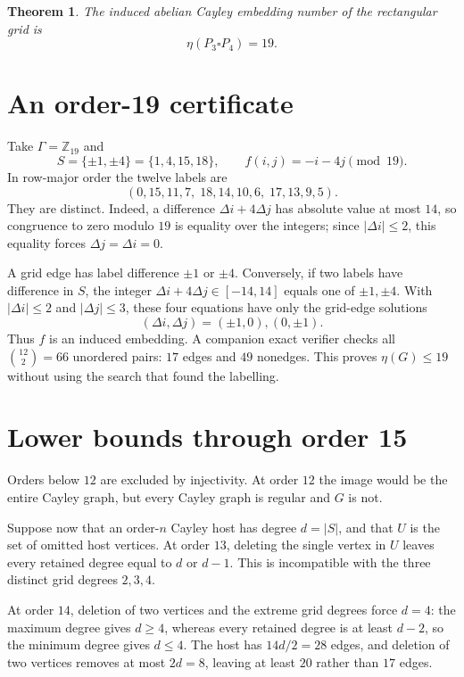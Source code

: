 \documentclass[11pt]{article}
\newtheorem{theorem}{Theorem}
\begin{document}
\begin{theorem}\label{thm:main}
The induced abelian Cayley embedding number of the rectangular grid is
\[
  \eta(P_3\square P_4)=19.
\]
\end{theorem}

\section{An order-19 certificate}

Take $\Gamma=\mathbb Z_{19}$ and
\[
 S=\{\pm1,\pm4\}=\{1,4,15,18\},\qquad
 f(i,j)=-i-4j\pmod {19}.
\]
In row-major order the twelve labels are
\[
 (0,15,11,7,\;18,14,10,6,\;17,13,9,5).
\]
They are distinct.  Indeed, a difference $\Delta i+4\Delta j$ has
absolute value at most $14$, so congruence to zero modulo $19$ is
equality over the integers; since $|\Delta i|\leq2$, this equality forces
$\Delta j=\Delta i=0$.

A grid edge has label difference $\pm1$ or $\pm4$.  Conversely, if two
labels have difference in $S$, the integer
$\Delta i+4\Delta j\in[-14,14]$ equals one of $\pm1,\pm4$.  With
$|\Delta i|\leq2$ and $|\Delta j|\leq3$, these four equations have only
the grid-edge solutions
\[
 (\Delta i,\Delta j)=(\pm1,0),(0,\pm1).
\]
Thus $f$ is an induced embedding.  A companion exact verifier checks all
$\binom{12}{2}=66$ unordered pairs: $17$ edges and $49$ nonedges.  This
proves $\eta(G)\leq19$ without using the search that found the labelling.

\section{Lower bounds through order 15}

Orders below $12$ are excluded by injectivity.  At order $12$ the image
would be the entire Cayley graph, but every Cayley graph is regular and
$G$ is not.

Suppose now that an order-$n$ Cayley host has degree $d=|S|$, and that
$U$ is the set of omitted host vertices.  At order $13$, deleting the
single vertex in $U$ leaves every retained degree equal to $d$ or $d-1$.
This is incompatible with the three distinct grid degrees $2,3,4$.

At order $14$, deletion of two vertices and the extreme grid degrees
force $d=4$: the maximum degree gives $d\geq4$, whereas every retained
degree is at least $d-2$, so the minimum degree gives $d\leq4$.  The host
has $14d/2=28$ edges, and deletion of two vertices removes at most
$2d=8$, leaving at least $20$ rather than $17$ edges.
\end{document}

